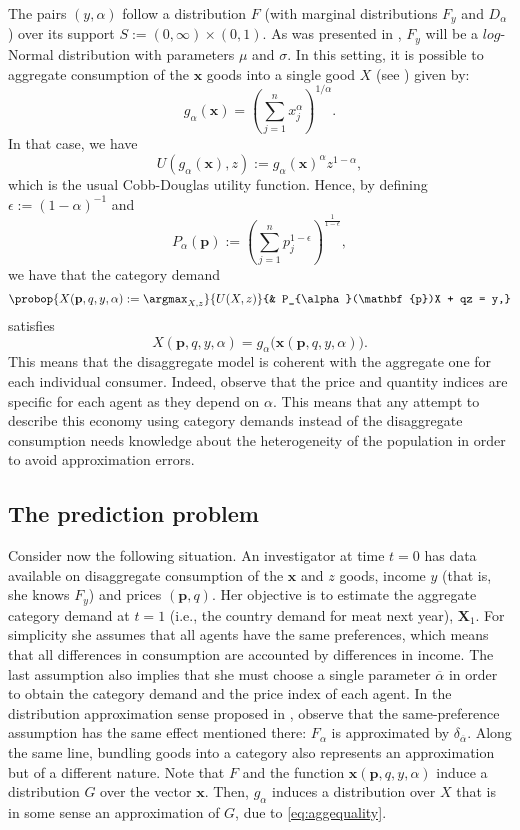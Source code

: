 \documentclass[english, a4paper,12pt]{article}
\begin{document}
The pairs $(y,\alpha)$ follow a distribution $F$ (with marginal distributions $F_{y}$ and $D_{\alpha}$) over its support $S := (0,\infty) \times  (0,1)$. As was presented in , $F_{y}$ will be a $log$-Normal distribution with parameters $\mu$ and $\sigma$. In this setting, it is possible to aggregate consumption of the $\mathbf{x}$ goods into a single good $X$ (see ) given by: 
	$$g_{\alpha}(\mathbf{x}) = \left(\sum_{j=1}^{n} x_{j}^{\alpha}\right)^{1/\alpha}.$$
In that case, we have
	$$U(g_{\alpha}(\mathbf{x}), z) := g_{\alpha}(\mathbf{x})^{\alpha}z^{1-\alpha},$$
which is the usual Cobb-Douglas utility function. Hence, by defining $\epsilon := (1-\alpha)^{-1}$ and
	$$P_{\alpha}(\mathbf{p}) :=  \left( \sum_{j=1}^{n} p_{j}^{1-\epsilon} \right)^{\frac{1}{1-\epsilon}},$$
we have that the category demand
	\begin{equation} \label{eq:probagg}
		\probop{X(\mathbf{p}, q, y, \alpha) := \argmax_{X, z}}{U(X,z)}
										{&	P_{\alpha}(\mathbf{p})X + qz = y,}
	\end{equation}
satisfies
	\begin{equation} \label{eq:aggequality}
		X(\mathbf{p}, q, y, \alpha) = g_{\alpha}\big(\mathbf{x}(\mathbf{p}, q, y, \alpha)\big).
	\end{equation}
This means that the disaggregate model is coherent with the aggregate one for each individual consumer. Indeed, observe that the price and quantity indices are specific for each agent as they depend on $\alpha$. This means that any attempt to describe this economy using category demands instead of the disaggregate consumption needs knowledge about the heterogeneity of the population in order to avoid approximation errors.

\subsection{The prediction problem}
Consider now the following situation. An investigator at time $t = 0$ has data available on disaggregate consumption of the $\mathbf{x}$ and $z$ goods, income $y$ (that is, she knows $F_{y}$) and prices $(\mathbf{p},q)$. Her objective is to estimate the aggregate category demand at $t=1$ (i.e., the country demand for meat next year), $\mathbf{X}_{1}$. For simplicity she assumes that all agents have the same preferences, which means that all differences in consumption are accounted by differences in income. The last assumption also implies that she must choose a single parameter $\overline{\alpha}$ in order to obtain the category demand and the price index of each agent. In the distribution approximation sense proposed in , observe that the same-preference assumption has the same effect mentioned there: $F_{\alpha}$ is approximated by $\delta_{\overline{\alpha}}$. Along the same line, bundling goods into a category also represents an approximation but of a different nature. Note that $F$ and the function $\mathbf{x}(\mathbf{p}, q, y, \alpha)$ induce a distribution $G$ over the vector $\mathbf{x}$. Then, $g_{\alpha}$ induces a distribution over $X$ that is in some sense an approximation of $G$, due to \eqref{eq:aggequality}. 
\end{document}
